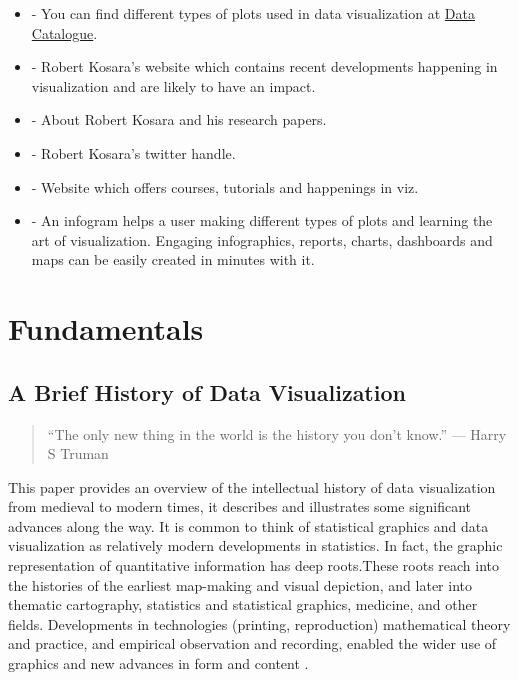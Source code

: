 \documentclass[]{book}
\providecommand{\tightlist}{%
  \setlength{\itemsep}{0pt}\setlength{\parskip}{0pt}}
\theoremstyle{definition}
\theoremstyle{definition}
\theoremstyle{definition}
\theoremstyle{remark}
\begin{document}
\begin{itemize}
\tightlist
\item
  \citep{charts_viz} - You can find different types of plots used in
  data visualization at
  \href{https://datavizcatalogue.com/search.html}{Data Catalogue}.
\item
  \citep{eagereyes_viz} - Robert Kosara's website which contains recent
  developments happening in visualization and are likely to have an
  impact.
\item
  \citep{research_viz} - About Robert Kosara and his research papers.
\item
  \citep{twitter_Kosara} - Robert Kosara's twitter handle.
\item
  \citep{flowingdata} - Website which offers courses, tutorials and
  happenings in viz.
\item
  \citep{infogram} - An infogram helps a user making different types of
  plots and learning the art of visualization. Engaging infographics,
  reports, charts, dashboards and maps can be easily created in minutes
  with it.
\end{itemize}

\chapter{Fundamentals}\label{fundamentals}

\section{A Brief History of Data
Visualization}\label{a-brief-history-of-data-visualization}

\begin{quote}
``The only new thing in the world is the history you don't know.'' ---
Harry S Truman
\end{quote}

This paper provides an overview of the intellectual history of data
visualization from medieval to modern times, it describes and
illustrates some significant advances along the way. It is common to
think of statistical graphics and data visualization as relatively
modern developments in statistics. In fact, the graphic representation
of quantitative information has deep roots.These roots reach into the
histories of the earliest map-making and visual depiction, and later
into thematic cartography, statistics and statistical graphics,
medicine, and other fields. Developments in technologies (printing,
reproduction) mathematical theory and practice, and empirical
observation and recording, enabled the wider use of graphics and new
advances in form and content \citep{data_viz_history}.
\end{document}
